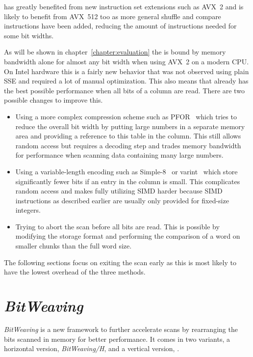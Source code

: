 \simdscan{} has greatly benefited from new instruction set extensions such as
AVX~2 \cite{AVX2-Scan} and is likely to benefit from AVX~512 too as more general
shuffle and compare instructions have been added, reducing the amount of
instructions needed for some bit widths.

As will be shown in chapter~\ref{chapter:evaluation} the \simdscan{} is bound by
memory bandwidth alone for almost any bit width when using AVX~2 on a modern
CPU. On Intel hardware this is a fairly new behavior that was not observed using
plain SSE \cite{AVX2-Scan} and required a lot of manual optimization. This also
means that \simdscan{} already has the best possible performance when all bits
of a column are read. There are two possible changes to improve this.

\begin{itemize}
  \item Using a more complex compression scheme such as PFOR~\cite{PFOR} which
    tries to reduce the overall bit width by putting large numbers in a separate
    memory area and providing a reference to this table in the column. This
    still allows random access but requires a decoding step and trades
    memory bandwidth for performance when scanning data containing many large
    numbers.
  \item Using a variable-length encoding such as Simple-8~\cite{Simple8} or
    varint~\cite{varint} which store significantly fewer bits if an entry in the
    column is small. This complicates random access and makes fully utilizing
    SIMD harder because SIMD instructions as described earlier are usually only
    provided for fixed-size integers.
  \item Trying to abort the scan before all bits are read. This is possible by
    modifying the storage format and performing the comparison of a word on
    smaller chunks than the full word size.
\end{itemize}

The following sections focus on exiting the scan early as this is most likely to
have the lowest overhead of the three methods.

\section{\emph{BitWeaving}}

\emph{BitWeaving} \cite{BitWeaving} is a new framework to further accelerate
scans by rearranging the bits scanned in memory for better performance. It comes
in two variants, a horizontal version, \emph{BitWeaving/H}, and a vertical
version, \bwv{}.

